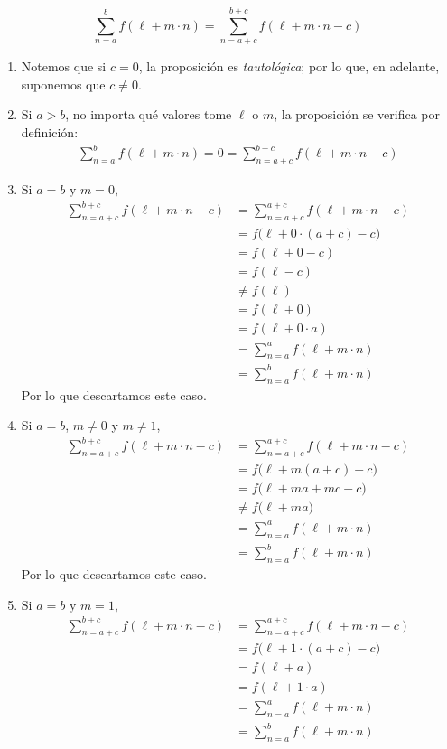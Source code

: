 \begin{enumerate}[label=\alph*)]
  \[\sum_{n=a}^b f(\ell+m\cdot n) = \sum_{n=a+c}^{b+c} f(\ell+m\cdot n-c)\]

  \begin{enumerate}[label=\Roman*)]
    \item Notemos que si $c=0$, la proposición es \textit{tautológica}; por lo que, en adelante, suponemos que $c\neq 0$.
    \item Si $a>b$, no importa qué valores tome $\ell$ o $m$, la proposición se verifica por definición:
    \begin{align*}
      \sum_{n=a}^b f(\ell+m\cdot n) = 0 = \sum_{n=a+c}^{b+c} f(\ell+m\cdot n-c)
    \end{align*}
    \item Si $a=b$ y $m=0$,
    \begin{align*}
      \sum_{n=a+c}^{b+c} f(\ell+m\cdot n-c) &= \sum_{n=a+c}^{a+c} f(\ell+m\cdot n-c)\\
      &= f\bigl(\ell+0\cdot (a+c)-c\bigr)\\
      &=f(\ell+0-c)\\
      &= f(\ell-c)\\
      &\neq f(\ell)\\
      &= f(\ell+0)\\
      &= f(\ell+0\cdot a)\\
      &= \sum_{n=a}^a f(\ell+m\cdot n)\\
      &= \sum_{n=a}^b f(\ell+m\cdot n)
    \end{align*}
    Por lo que descartamos este caso.

    \item Si $a=b$, $m\neq 0$ y $m\neq 1$,
    \begin{align*}
      \sum_{n=a+c}^{b+c} f(\ell+m\cdot n-c) &= \sum_{n=a+c}^{a+c} f(\ell+m\cdot n-c)\\
      &= f\bigl(\ell+m(a+c)-c\bigr)\\
      &= f\bigl(\ell+ma+mc-c\bigr)\\
      &\neq f\bigl(\ell+ma\bigr)\\
      &= \sum_{n=a}^a f(\ell+m\cdot n)\\
      &= \sum_{n=a}^b f(\ell+m\cdot n)
    \end{align*}
    Por lo que descartamos este caso.

    \item Si $a=b$ y $m=1$,
    \begin{align*}
      \sum_{n=a+c}^{b+c} f(\ell+m\cdot n-c) &= \sum_{n=a+c}^{a+c} f(\ell+m\cdot n-c)\\
      &= f\bigl(\ell+1\cdot (a+c)-c\bigr)\\
      &= f(\ell + a)\\
      &= f(\ell+1\cdot a)\\
      &= \sum_{n=a}^a f(\ell+m\cdot n)\\
      &= \sum_{n=a}^b f(\ell+m\cdot n)
    \end{align*}


\end{enumerate}
\end{enumerate}
